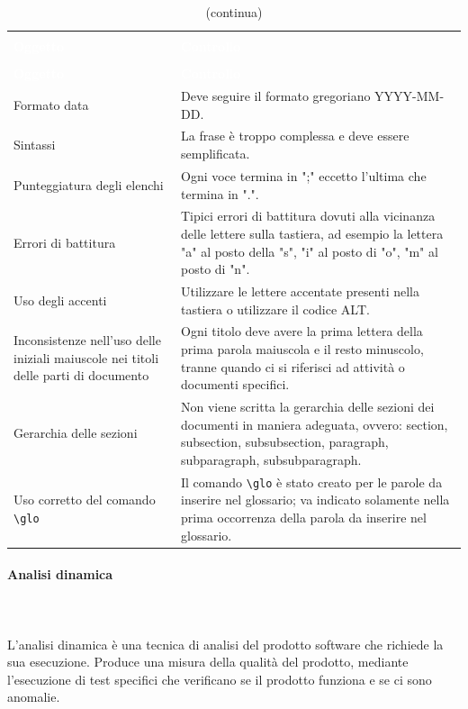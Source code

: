 \begin{longtable}{C{4.5cm} L{11cm}}
	\caption{Errori frequenti nei documenti.}\\
\textcolor{white}{\textbf{Oggetto}} & \centerline{\textcolor{white}{\textbf{Controllo}}} \\
		\endfirsthead
		\caption[]{(continua)} \\
\textcolor{white}{\textbf{Oggetto}} & \centerline{\textcolor{white}{\textbf{Controllo}}} \\
		\endhead
Formato data & Deve seguire il formato gregoriano YYYY-MM-DD. \\
Sintassi & La frase è troppo complessa e deve essere semplificata. \\
Punteggiatura degli elenchi & Ogni voce termina in ";" eccetto l'ultima che termina in ".".\\
Errori di battitura & Tipici errori di battitura dovuti alla vicinanza delle
lettere sulla tastiera, ad esempio la lettera "a" al posto della "s", "i" al posto di "o", "m" al posto di "n". \\
Uso degli accenti & Utilizzare le lettere accentate presenti nella tastiera o utilizzare il codice ALT. \\
Inconsistenze nell’uso delle iniziali maiuscole nei titoli delle parti di documento & Ogni titolo deve avere la prima lettera della prima parola maiuscola e il resto minuscolo, tranne quando ci si riferisci ad attività o documenti specifici. \\
Gerarchia delle sezioni & Non viene scritta la gerarchia delle sezioni dei documenti in maniera adeguata, ovvero: section, subsection, subsubsection, paragraph, subparagraph, subsubparagraph. \\
Uso corretto del comando  \verb|\glo| & Il comando \verb|\glo| è stato creato per le parole da inserire nel glossario; va indicato solamente nella prima occorrenza della parola da inserire nel glossario.
\end{longtable}

\paragraph{Analisi dinamica} \mbox{} \\ \mbox{} \\
L'analisi dinamica è una tecnica di analisi del prodotto software che richiede la sua esecuzione. Produce una misura della qualità del prodotto, mediante l'esecuzione di test specifici che verificano se il prodotto funziona e se ci sono anomalie.

